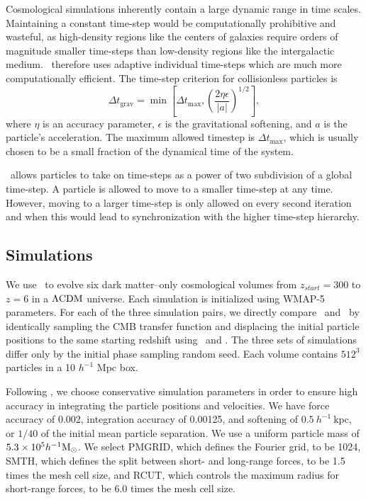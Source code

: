 Cosmological simulations inherently contain a large dynamic range in time scales.  Maintaining a constant time-step would be computationally prohibitive and wasteful, as high-density regions like the centers of galaxies require orders of magnitude smaller time-steps than low-density regions like the intergalactic medium.  \gadgettwo\ therefore uses adaptive individual time-steps which are much more computationally efficient.  The time-step criterion for collisionless particles is
\begin{equation}
	\Delta t_{\mathrm{grav}} = \min \left[ \Delta t_{\max}, \left( \frac{2 \eta \epsilon}{|a|} \right)^{1/2} \right],
\end{equation}
where $\eta$ is an accuracy parameter, $\epsilon$ is the gravitational softening, and $a$ is the particle's acceleration.  The maximum allowed timestep is $\Delta t_{\max}$, which is usually chosen to be a small fraction of the dynamical time of the system.

\gadgettwo\ allows particles to take on time-steps as a power of two subdivision of a global time-step.  A particle is allowed to move to a smaller time-step at any time.  However, moving to a larger time-step is only allowed on every second iteration and when this would lead to synchronization with the higher time-step hierarchy.




\subsection{Simulations}
\label{subsec:gadget--simulations}


We use \gadgettwo\ to evolve six dark matter--only cosmological volumes from $z_{start} = 300$ to $z = 6$ in a $\rm \Lambda CDM$ universe.  Each simulation is initialized using WMAP-5 \citep{2009ApJS..180..330K} parameters.  For each of the three simulation pairs, we directly compare \lpt\ and \za\ by identically sampling the CMB transfer function and displacing the initial particle positions to the same starting redshift using \lpt\ and \za.  The three sets of simulations differ only by the initial phase sampling random seed.  Each volume contains $512^{3}$ particles in a 10 $h^{-1}$ Mpc box.

Following \citet{2010ApJ...715..104H}, we choose conservative simulation parameters in order to ensure high accuracy in integrating the particle positions and velocities.  We have force accuracy of 0.002, integration accuracy of 0.00125, and softening of $0.5\ h^{-1}\ \mathrm{kpc}$, or $1 / 40$ of the initial mean particle separation.  We use a uniform particle mass of $5.3 \times 10^{5} h^{-1} {\rm M_\odot}$.  We select PMGRID, which defines the Fourier grid, to be 1024, SMTH, which defines the split between short- and long-range forces, to be 1.5 times the mesh cell size, and RCUT, which controls the maximum radius for short-range forces, to be 6.0 times the mesh cell size.





